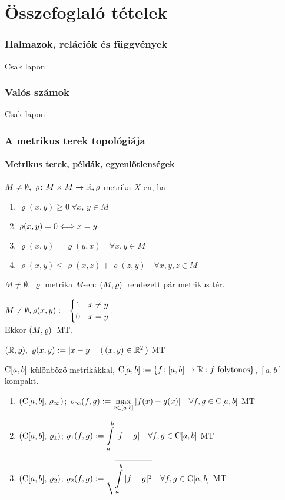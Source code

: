 \part{Összefoglaló tételek}
\section{Halmazok, relációk és függvények}
Csak lapon
\section{Valós számok}
Csak lapon
\newpage
\section{A metrikus terek topológiája}
\subsection{Metrikus terek, példák, egyenlőtlenségek}
\begin{de}[Metrika]
$M\not=\emptyset,\ \varrho\colon M\times M\to\mathbb{R},\varrho$ metrika $X$-en, ha
  \begin{enumerate}
\item $\varrho(x,y)\geq 0\ \forall x,\,y\in M$
\item $\varrho(x,y)=0\Longleftrightarrow x=y$
\item $\varrho(x,y)=\varrho(y,x)\quad  \forall x,y\in M$
  \item $\varrho(x,y)\leq\varrho(x,z)+\varrho(z,y)\quad\forall x,y,z\in M$
\end{enumerate}
\end{de}

\begin{de}
  $M\ne\emptyset,\ \varrho$ metrika $M$-en: $(M,\varrho)\,$ rendezett pár metrikus tér.
\end{de}

\begin{Pl}
\item $M\ne \emptyset, \varrho(x,y) := \begin{cases}1&x\ne y\\0& x=y\end{cases}$.\\ Ekkor $(M,\varrho)\,$ MT.
\item $(\mathbb{R},\varrho),\ \varrho(x,y):=\vert x-y\vert\quad (\,(x,y)\in\mathbb{R}^2\,)$  MT
\item $\operatorname{C}[a,b]$  különböző metrikákkal, $\operatorname{C}[a,b]:=\{f\colon[a,b]\to\mathbb{R}: f\text{ folytonos}\}$, $[a,b]$ kompakt.
{\renewcommand{\labelenumii}{\theenumii$)$}\begin{enumerate}
\item $(\operatorname{C}[a,b],\,\varrho_\infty)$; $\displaystyle\varrho_\infty(f,g):=\max_{x\in[a,b]}\vert f(x)-g(x)\vert\quad \forall f,g\in\operatorname{C}[a,b]$  MT
\item $(\operatorname{C}[a,b],\,\varrho_1)$; $\di\ro_1(f,g):=\Int_a^b \vert f-g\vert\quad\forall f,g\in\Folyt[a,b]$   MT
\item $(\operatorname{C}[a,b],\,\varrho_2)$; $\di\ro_2(f,g):=\sqrt{\Int_a^b\vert f-g\vert^2}\quad\forall f,g\in\Folyt[a,b]$  MT
\end{enumerate}}
\end{Pl}

